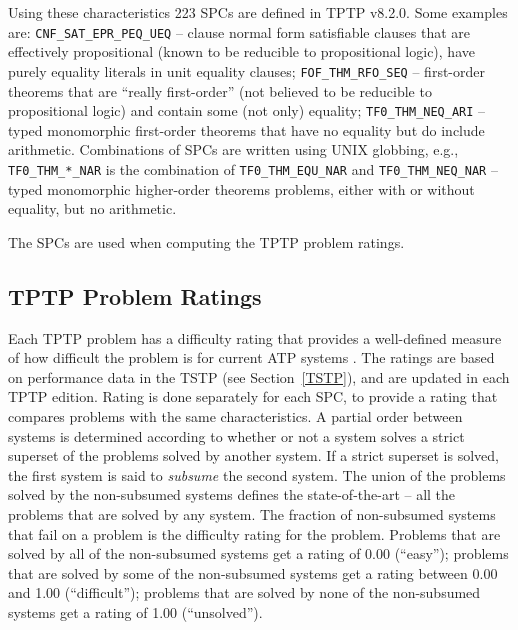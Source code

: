 \documentclass[runningheads]{llncs}
\begin{document}
Using these characteristics 223 SPCs are defined in TPTP v8.2.0.
Some examples are:
{\tt CNF\_SAT\_EPR\_PEQ\_UEQ} -- clause normal form satisfiable clauses that are effectively
propositional (known to be reducible to propositional logic), have purely equality literals
in unit equality clauses;
{\tt FOF\_THM\_RFO\_SEQ} -- first-order theorems that are ``really first-order'' (not believed
to be reducible to propositional logic) and contain some (not only) equality;
{\tt TF0\_THM\_NEQ\_ARI} -- typed monomorphic first-order theorems that have no equality but do
include arithmetic.
Combinations of SPCs are written using UNIX globbing, e.g., {\tt TF0\_THM\_*\_NAR} is the
combination of {\tt TF0\_THM\_EQU\_NAR} and {\tt TF0\_THM\_NEQ\_NAR} -- typed monomorphic 
higher-order theorems problems, either with or without equality, but no arithmetic.

The SPCs are used when computing the TPTP problem ratings.

\subsection{TPTP Problem Ratings}
\label{Ratings}

Each TPTP problem has a difficulty rating that provides a well-defined measure of how difficult 
the problem is for current ATP systems \cite{SS01}.
The ratings are based on performance data in the TSTP (see Section~\ref{TSTP}), and are updated
in each TPTP edition.
Rating is done separately for each SPC, to provide a rating that compares problems with the
same characteristics.
A partial order between systems is determined according to whether or not a system solves a strict 
superset of the problems solved by another system. 
If a strict superset is solved, the first system is said to {\em subsume} the second system. 
The union of the problems solved by the non-subsumed systems defines the state-of-the-art -- all 
the problems that are solved by any system. 
The fraction of non-subsumed systems that fail on a problem is the difficulty rating for the 
problem. 
Problems that are solved by all of the non-subsumed systems get a rating of 0.00 (``easy'');
problems that are solved by some of the non-subsumed systems get a rating between 
0.00 and 1.00 (``difficult''); 
problems that are solved by none of the non-subsumed systems get a rating of 1.00 (``unsolved'').

\end{document}
